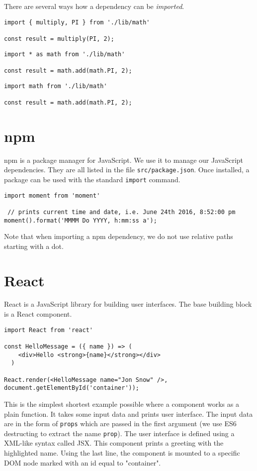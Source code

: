 There are several ways how a dependency can be \emph{imported}.

\begin{verbatim}
import { multiply, PI } from './lib/math'

const result = multiply(PI, 2);
\end{verbatim}

\begin{verbatim}
import * as math from './lib/math'

const result = math.add(math.PI, 2);
\end{verbatim}

\begin{verbatim}
import math from './lib/math'

const result = math.add(math.PI, 2);
\end{verbatim}

\section{npm}
npm \cite{npm} is a package manager for JavaScript. We use it to manage our JavaScript dependencies. They are all listed in the file \texttt{src/package.json}. Once installed, a package can be used with the standard \texttt{import} command.

\begin{verbatim}
import moment from 'moment'

 // prints current time and date, i.e. June 24th 2016, 8:52:00 pm
moment().format('MMMM Do YYYY, h:mm:ss a');
\end{verbatim}

Note that when importing a npm dependency, we do not use relative paths starting with a dot.

\section{React}
React \cite{react} is a JavaScript library for building user interfaces. The base building block is a React component.

\begin{verbatim}
import React from 'react'

const HelloMessage = ({ name }) => (
    <div>Hello <strong>{name}</strong></div>
  )

React.render(<HelloMessage name="Jon Snow" />, document.getElementById('container'));
\end{verbatim}


This is the simplest shortest example possible where a component works as a plain function. It takes some input data and prints user interface. The input data are in the form of \texttt{props} which are passed in the first argument (we use ES6 destructing to extract the name \texttt{prop}). The user interface is defined using a XML-like syntax called JSX. This component prints a greeting with the highlighted name. Using the last line, the component is mounted to a specific DOM node marked with an id equal to "container".

